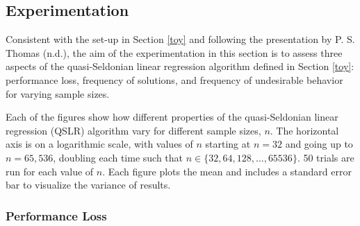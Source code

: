 \documentclass[12pt, twoside]{amherstthesis}
\begin{document}
\hypertarget{exp}{%
\subsection{Experimentation}\label{exp}}

Consistent with the set-up in Section \ref{toy} and following the presentation by P. S. Thomas (n.d.), the aim of the experimentation in this section is to assess three aspects of the quasi-Seldonian linear regression algorithm defined in Section \ref{toy}: performance loss, frequency of solutions, and frequency of undesirable behavior for varying sample sizes.

Each of the figures show how different properties of the quasi-Seldonian linear regression (QSLR) algorithm vary for different sample sizes, \(\textit{n}\). The horizontal axis is on a logarithmic scale, with values of \(\textit{n}\) starting at \(\textit{n} = 32\) and going up to \(\textit{n} = 65,536\), doubling each time such that \(\textit{n} \in \{32, 64, 128, \ldots, 65536 \}\). 50 trials are run for each value of \(n\). Each figure plots the mean and includes a standard error bar to visualize the variance of results.

\hypertarget{performance-loss}{%
\subsubsection{Performance Loss}\label{performance-loss}}
\end{document}
